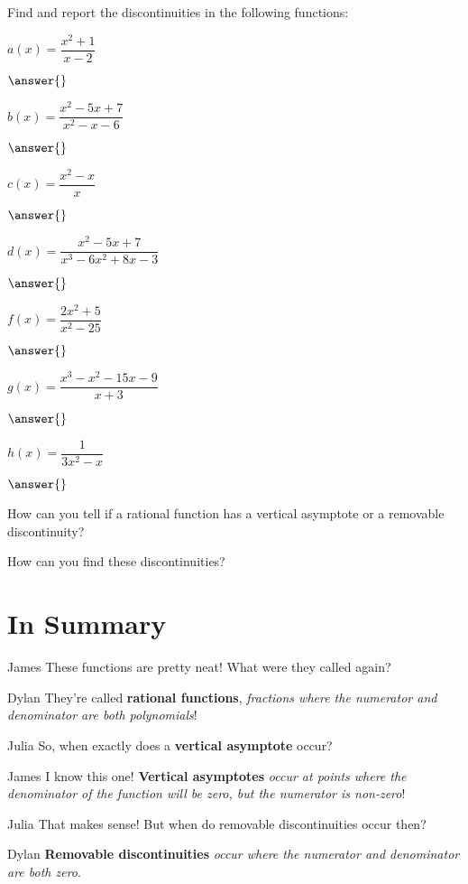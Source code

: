 \documentclass{ximera}
\begin{document}
Find and report the discontinuities in the following functions:

\begin{question}
$a(x) = \dfrac{x^2+1}{x-2}$

$\answer{}$

$b(x) = \dfrac{x^2-5x+7}{x^2-x-6}$

$\answer{}$

$c(x) = \dfrac{x^2-x}{x}$

$\answer{}$

$d(x) = \dfrac{x^2-5x+7}{x^3-6x^2+8x-3}$

$\answer{}$

$f(x) = \dfrac{2x^2+5}{x^2-25}$

$\answer{}$

$g(x) = \dfrac{x^3-x^2-15x-9}{x+3}$

$\answer{}$

$h(x) = \dfrac{1}{3x^2-x}$

$\answer{}$
\end{question}
\begin{question}
How can you tell if a rational function has a vertical asymptote or a removable discontinuity?
\begin{freeResponse}
\end{freeResponse}
How can you find these discontinuities?
\begin{freeResponse}
\end{freeResponse}
\end{question}

\section{In Summary}
\begin{dialogue}
\item[James] These functions are pretty neat! What were they called again?
\item[Dylan] They're called \textbf{rational functions}, \textit{fractions where the numerator and denominator are both polynomials}!
\item[Julia] So, when exactly does a \textbf{vertical asymptote} occur?
\item[James] I know this one! \textbf{Vertical asymptotes} \textit{occur at points where the denominator of the function will be zero, but the numerator is non-zero}!
\item[Julia] That makes sense! But when do removable discontinuities occur then?
\item[Dylan] \textbf{Removable discontinuities} \textit{occur where the numerator and denominator are both zero}.
\end{dialogue}
\end{document}
